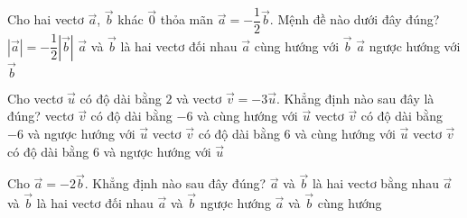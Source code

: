 \begin{ex}%
	Cho hai vectơ $\overrightarrow{a}$, $\overrightarrow{b}$ khác $\overrightarrow{0}$ thỏa mãn $\overrightarrow{a}=-\dfrac{1}{2}\overrightarrow{b}$. Mệnh đề nào dưới đây đúng?
	\choice
	{$\left|\overrightarrow{a}\right|=-\dfrac{1}{2}\left|\overrightarrow{b}\right|$}
	{$\overrightarrow{a}$ và $\overrightarrow{b}$ là hai vectơ đối nhau}
	{$\overrightarrow{a}$ cùng hướng với $\overrightarrow{b}$}
	{\True $\overrightarrow{a}$ ngược hướng với $\overrightarrow{b}$}
\end{ex}
\begin{ex}%
	Cho vectơ $\overrightarrow{u}$ có độ dài bằng $2$ và vectơ $\overrightarrow{v}= -3\overrightarrow{u}$. Khẳng định nào sau đây là đúng?
	\choice
	{vectơ $\overrightarrow{v}$ có độ dài bằng $-6$ và cùng hướng với $\overrightarrow{u}$}
	{vectơ $\overrightarrow{v}$ có độ dài bằng $-6$ và ngược hướng với $\overrightarrow{u}$}
	{vectơ $\overrightarrow{v}$ có độ dài bằng $6$ và cùng hướng với $\overrightarrow{u}$}
	{\True vectơ $\overrightarrow{v}$ có độ dài bằng $6$ và ngược hướng với $\overrightarrow{u}$}
\end{ex}
\begin{ex}%
	Cho $\overrightarrow{a}=-2 \overrightarrow{b}$. Khẳng định nào sau đây đúng?
	\choice
	{\True $\overrightarrow{a}$ và $\overrightarrow{b}$ là hai vectơ bằng nhau}
	{$\overrightarrow{a}$ và $\overrightarrow{b}$ là hai vectơ đối nhau}
	{\True $\overrightarrow{a}$ và $\overrightarrow{b}$ ngược hướng}
	{$\overrightarrow{a}$ và $\overrightarrow{b}$ cùng hướng}
\end{ex}
